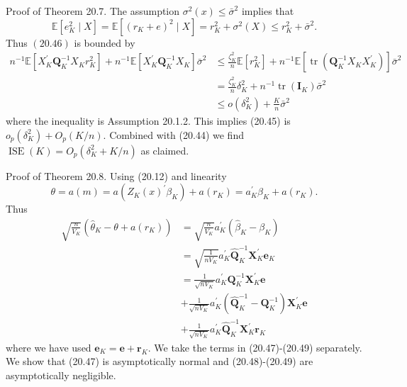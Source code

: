 \documentclass[10pt]{article}
\begin{document}
Proof of Theorem 20.7. The assumption $\sigma^{2}(x) \leq \bar{\sigma}^{2}$ implies that
$$
\mathbb{E}\left[e_{K}^{2} \mid X\right]=\mathbb{E}\left[\left(r_{K}+e\right)^{2} \mid X\right]=r_{K}^{2}+\sigma^{2}(X) \leq r_{K}^{2}+\bar{\sigma}^{2} .
$$
Thus $(20.46)$ is bounded by
$$
\begin{aligned}
n^{-1} \mathbb{E}\left[X_{K}^{\prime} \boldsymbol{Q}_{K}^{-1} X_{K} r_{K}^{2}\right]+n^{-1} \mathbb{E}\left[X_{K}^{\prime} \boldsymbol{Q}_{K}^{-1} X_{K}\right] \bar{\sigma}^{2} & \leq \frac{\zeta_{K}^{2}}{n} \mathbb{E}\left[r_{K}^{2}\right]+n^{-1} \mathbb{E}\left[\operatorname{tr}\left(\boldsymbol{Q}_{K}^{-1} X_{K} X_{K}^{\prime}\right)\right] \bar{\sigma}^{2} \\
&=\frac{\zeta_{K}^{2}}{n} \delta_{K}^{2}+n^{-1} \operatorname{tr}\left(\boldsymbol{I}_{K}\right) \bar{\sigma}^{2} \\
& \leq o\left(\delta_{K}^{2}\right)+\frac{K}{n} \bar{\sigma}^{2}
\end{aligned}
$$
where the inequality is Assumption 20.1.2. This implies (20.45) is $o_{p}\left(\delta_{K}^{2}\right)+O_{p}(K / n)$. Combined with (20.44) we find $\operatorname{ISE}(K)=O_{p}\left(\delta_{K}^{2}+K / n\right)$ as claimed.

Proof of Theorem 20.8. Using (20.12) and linearity
$$
\theta=a(m)=a\left(Z_{K}(x)^{\prime} \beta_{K}\right)+a\left(r_{K}\right)=a_{K}^{\prime} \beta_{K}+a\left(r_{K}\right) .
$$
Thus
$$
\begin{aligned}
\sqrt{\frac{n}{V_{K}}}\left(\widehat{\theta}_{K}-\theta+a\left(r_{K}\right)\right) &=\sqrt{\frac{n}{V_{K}}} a_{K}^{\prime}\left(\widehat{\beta}_{K}-\beta_{K}\right) \\
&=\sqrt{\frac{1}{n V_{K}}} a_{K}^{\prime} \widehat{\boldsymbol{Q}}_{K}^{-1} \boldsymbol{X}_{K}^{\prime} \boldsymbol{e}_{K} \\
&=\frac{1}{\sqrt{n V_{K}}} a_{K}^{\prime} \boldsymbol{Q}_{K}^{-1} \boldsymbol{X}_{K}^{\prime} \boldsymbol{e} \\
&+\frac{1}{\sqrt{n V_{K}}} a_{K}^{\prime}\left(\widehat{\boldsymbol{Q}}_{K}^{-1}-\boldsymbol{Q}_{K}^{-1}\right) \boldsymbol{X}_{K}^{\prime} \boldsymbol{e} \\
&+\frac{1}{\sqrt{n V_{K}}} a_{K}^{\prime} \widehat{\boldsymbol{Q}}_{K}^{-1} \boldsymbol{X}_{K}^{\prime} \boldsymbol{r}_{K}
\end{aligned}
$$
where we have used $\boldsymbol{e}_{K}=\boldsymbol{e}+\boldsymbol{r}_{K}$. We take the terms in (20.47)-(20.49) separately. We show that (20.47) is asymptotically normal and (20.48)-(20.49) are asymptotically negligible.
\end{document}
